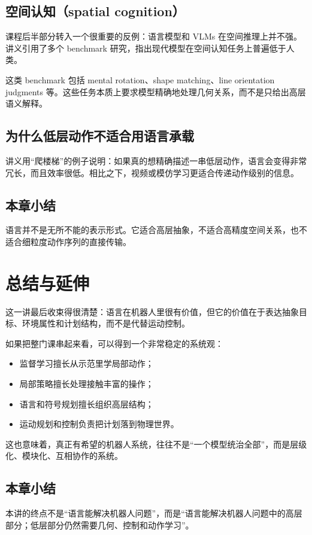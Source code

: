 \documentclass[a4paper]{article}
\begin{document}
\subsection{空间认知（spatial cognition）}

课程后半部分转入一个很重要的反例：语言模型和 VLMs 在空间推理上并不强。
讲义引用了多个 benchmark 研究，指出现代模型在空间认知任务上普遍低于人类。

这类 benchmark 包括 mental rotation、shape matching、line orientation judgments 等。这些任务本质上要求模型精确地处理几何关系，而不是只给出高层语义解释。

\subsection{为什么低层动作不适合用语言承载}

讲义用“爬楼梯”的例子说明：如果真的想精确描述一串低层动作，语言会变得非常冗长，而且效率很低。相比之下，视频或模仿学习更适合传递动作级别的信息。

\subsection{本章小结}

语言并不是无所不能的表示形式。它适合高层抽象，不适合高精度空间关系，也不适合细粒度动作序列的直接传输。

\section{总结与延伸}

这一讲最后收束得很清楚：语言在机器人里很有价值，但它的价值在于表达抽象目标、环境属性和计划结构，而不是代替运动控制。

如果把整门课串起来看，可以得到一个非常稳定的系统观：
\begin{itemize}
  \item 监督学习擅长从示范里学局部动作；
  \item 局部策略擅长处理接触丰富的操作；
  \item 语言和符号规划擅长组织高层结构；
  \item 运动规划和控制负责把计划落到物理世界。
\end{itemize}

这也意味着，真正有希望的机器人系统，往往不是“一个模型统治全部”，而是层级化、模块化、互相协作的系统。

\subsection{本章小结}

本讲的终点不是“语言能解决机器人问题”，而是“语言能解决机器人问题中的高层部分；低层部分仍然需要几何、控制和动作学习”。
\end{document}
